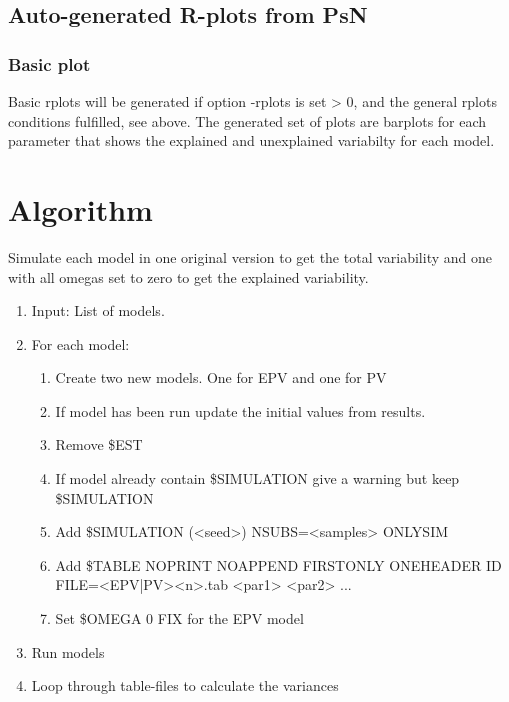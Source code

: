 \subsection{Auto-generated R-plots from PsN}
\newcommand{\rplotsconditions}{The default pvar template 
requires no extra R libraries.}


\subsubsection*{Basic plot}
Basic rplots will be generated if option -rplots is set > 0,
and the general rplots conditions fulfilled, see above.
The generated set of plots are barplots for each parameter
that shows the explained and unexplained variabilty for each
model.


\section{Algorithm}

Simulate each model in one original version to get the total variability and one with all omegas set to zero to get the explained variability.

\begin{enumerate}
	\item Input: List of models.
	\item For each model:
	\begin{enumerate}
		\item Create two new models. One for EPV and one for PV
		\item If model has been run update the initial values from results.
		\item Remove \$EST
		\item If model already contain \$SIMULATION give a warning but keep \$SIMULATION
		\item Add \$SIMULATION (<seed>) NSUBS=<samples> ONLYSIM
		\item Add \$TABLE NOPRINT NOAPPEND FIRSTONLY ONEHEADER ID FILE=<EPV|PV><n>.tab <par1> <par2> ...
		\item Set \$OMEGA 0 FIX for the EPV model
	\end{enumerate}
	\item Run models
	\item Loop through table-files to calculate the variances
\end{enumerate}



